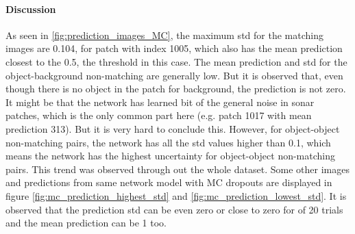 \clearpage

\paragraph{Discussion \\}
As seen in \ref{fig:prediction_images_MC}, the maximum std for the matching images are 0.104, for patch with index 1005, which also has the mean prediction closest to the 0.5, the threshold in this case. The mean prediction
and std for the object-background non-matching are generally low. But it is observed that, even though there is no object in the patch for background, the prediction is not zero. It might be that the network has learned bit of the general noise
in sonar patches, which is the only common part here (e.g. patch 1017 with mean prediction 313). But it is very hard to conclude this. However, for object-object non-matching pairs, the network has all the std values higher than 0.1, which means
the network has the highest uncertainty for object-object non-matching pairs. This trend was observed through out the whole dataset. Some other images and predictions from same network model with MC dropouts are displayed in 
figure \ref{fig:mc_prediction_highest_std} and
\ref{fig:mc_prediction_lowest_std}. It is observed that the prediction std can be even zero or close to zero for of 20 trials and the mean prediction can be 1 too.



